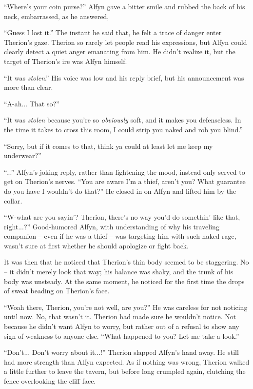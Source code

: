 ``Where's your coin purse?'' Alfyn gave a bitter smile and rubbed the back of his neck, embarrassed, as he answered,

``Guess I lost it.'' The instant he said that, he felt a trace of danger enter Therion's gaze. Therion so rarely let people read his expressions, but Alfyn could clearly detect a quiet anger emanating from him. He didn't realize it, but the target of Therion's ire was Alfyn himself.

``It was \emph{stolen}.'' His voice was low and his reply brief, but his announcement was more than clear.

``A-ah... That so?''

``It was \emph{stolen} because you're so \emph{obviously} soft, and it makes you defenseless. In the time it takes to cross this room, I could strip you naked and rob you blind.''

``Sorry, but if it comes to that, think ya could at least let me keep my underwear?''

``...'' Alfyn's joking reply, rather than lightening the mood, instead only served to get on Therion's nerves. ``You are aware I'm a thief, aren't you? What guarantee do you have I wouldn't do that?'' He closed in on Alfyn and lifted him by the collar.

``W-what are you sayin'? Therion, there's no way you'd do somethin' like that, right...?'' Good-humored Alfyn, with understanding of why his traveling companion -- even if he was a thief -- was targeting him with such naked rage, wasn't sure at first whether he should apologize or fight back.

It was then that he noticed that Therion's thin body seemed to be staggering. No -- it didn't merely look that way; his balance was shaky, and the trunk of his body was unsteady. At the same moment, he noticed for the first time the drops of sweat beading on Therion's face. 

``Woah there, Therion, you're not well, are you?'' He was careless for not noticing until now. No, that wasn't it. Therion had made sure he wouldn't notice. Not because he didn't want Alfyn to worry, but rather out of a refusal to show any sign of weakness to anyone else. ``What happened to you? Let me take a look.''

``Don't... Don't worry about it...!'' Therion slapped Alfyn's hand away. He still had more strength than Alfyn expected. As if nothing was wrong, Therion walked a little further to leave the tavern, but before long crumpled again, clutching the fence overlooking the cliff face.

